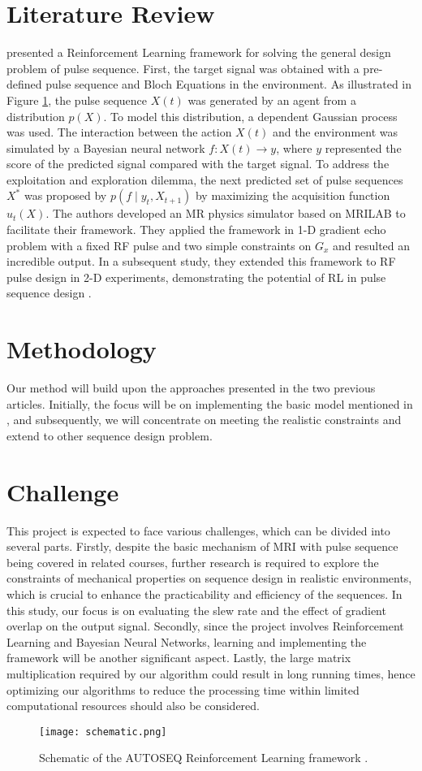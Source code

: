 \section{Literature Review}
\citet{0438} presented a Reinforcement Learning framework for solving the general design problem of pulse sequence. First, the target signal was obtained with a pre-defined pulse sequence and Bloch Equations in the environment. As illustrated in Figure \ref{schematic}, the pulse sequence $X(t)$ was generated by an agent from a distribution $p(X)$. To model this distribution, a dependent Gaussian process was used. The interaction between the action $X(t)$ and the environment was simulated by a Bayesian neural network $f:X(t) \rightarrow y$, where $y$ represented the score of the predicted signal compared with the target signal. To address the exploitation and exploration dilemma, the next predicted set of pulse sequences $X^*$ was proposed by $p\left(f \mid y_t, X_{t+1}\right)$ by maximizing the acquisition function $u_t(X)$. The authors developed an MR physics simulator based on MRILAB \citep{MRILAB} to facilitate their framework. They applied the framework in 1-D gradient echo problem with a fixed RF pulse and two simple constraints on $G_x$ and resulted an incredible output. In a subsequent study, they extended this framework to RF pulse design in 2-D experiments, demonstrating the potential of RL in pulse sequence design \cite{0477}.

\section{Methodology}
Our method will build upon the approaches presented in the two previous articles. Initially, the focus will be on implementing the basic model mentioned in \citep{0438}, and subsequently, we will concentrate on meeting the realistic constraints and extend to other sequence design problem. 

\section{Challenge}
This project is expected to face various challenges, which can be divided into several parts. Firstly, despite the basic mechanism of MRI with pulse sequence being covered in related courses, further research is required to explore the constraints of mechanical properties on sequence design in realistic environments, which is crucial to enhance the practicability and efficiency of the sequences. In this study, our focus is on evaluating the slew rate and the effect of gradient overlap on the output signal. Secondly, since the project involves Reinforcement Learning and Bayesian Neural Networks, learning and implementing the framework will be another significant aspect. Lastly, the large matrix multiplication required by our algorithm could result in long running times, hence optimizing our algorithms to reduce the processing time within limited computational resources should also be considered.


\begin{figure}[ht]
    \centering
    \texttt{[image: schematic.png]}
    \caption{Schematic of the AUTOSEQ Reinforcement Learning framework \citep{0438}.}
    \label{schematic}
\end{figure}